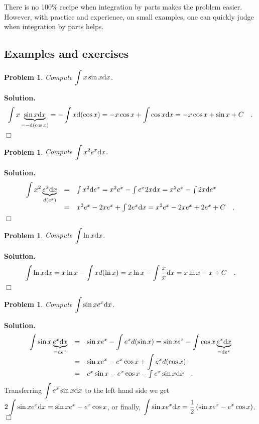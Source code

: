 \documentclass[12pt]{book}
\newenvironment{solution}{\medskip\noindent\textbf{Solution.} }{$\Box$}
\newtheorem{problem}[theorem]{Problem}
\begin{document}
There is no 100\% recipe when integration by parts makes the problem easier. However, with practice and experience, on small examples, one can quickly judge when integration by parts helps.
\subsection{Examples and exercises}
\begin{problem}
Compute $\displaystyle \int x \sin x {\normalfont \text{d}} x$.
\end{problem}
\begin{solution}
\[
\begin{array}{rcl}
\displaystyle\int x \underbrace{\sin x {\normalfont \text{d}} x}_{=-{\normalfont \text{d}}(\cos x)} = -\int x {\normalfont \text{d}}(\cos x) = -x\cos x + \int \cos x {\normalfont \text{d}} x = -x \cos x +\sin x +C\quad .
\end{array}
\]
\end{solution}
\begin{problem}
Compute $\displaystyle \int x^2 e^x {\normalfont \text{d}} x$.
\end{problem}
\begin{solution}
\[
\begin{array}{rcl}
\displaystyle\int x^2 \underbrace{e^x {\normalfont \text{d}} x}_{d (e^x)} &=& \int x^2 {\normalfont \text{d}} e^x= x^2e^x - \int e^x2x{\normalfont \text{d}} x=  x^2e^x - \int 2x{\normalfont \text{d}} e^x \\
&=& x^2e^x- 2xe^x+ \int 2e^x {\normalfont \text{d}} x= x^2e^x-2xe^x+2e^x+C\quad .
\end{array}
\]
\end{solution}
\begin{problem}
Compute $\displaystyle \int \ln x {\normalfont \text{d}} x $.
\end{problem}
\begin{solution}
\[
\int \ln x {\normalfont \text{d}} x = x\ln x - \int x d(\ln x)= x\ln x -\int \frac{x}{x}{\normalfont \text{d}} x= x\ln x-x+C\quad .
\]
\end{solution}
\begin{problem}
Compute $\displaystyle \int \sin x e^x {\normalfont \text{d}} x$.
\end{problem}
\begin{solution}
\[
\begin{array}{rcl}
\displaystyle\int \sin x \underbrace{e^x {\normalfont \text{d}} x}_{={\normalfont \text{d}} e^x}&=&\displaystyle\sin x e^x - \int e^xd(\sin x)=\sin x e^x - \int \cos x \underbrace{e^x {\normalfont \text{d}} x}_{={\normalfont \text{d}} e^x}\\
&=& \displaystyle\sin x e^x - e^x\cos x +\int e^x d(\cos x) \\
&=& e^x\sin x -e^x\cos x-\int e^x\sin x {\normalfont \text{d}} x\quad .
\end{array}
\]
Transferring $\displaystyle\int e^x\sin x {\normalfont \text{d}} x$ to the left hand side we get $\displaystyle 2\int \sin x e^x {\normalfont \text{d}} x = \sin x e^x-e^x\cos x$, or finally, $\displaystyle \int \sin x e^x {\normalfont \text{d}} x=\frac12 \left(\sin x e^x- e^x\cos x\right)$.
\end{solution}
\end{document}
